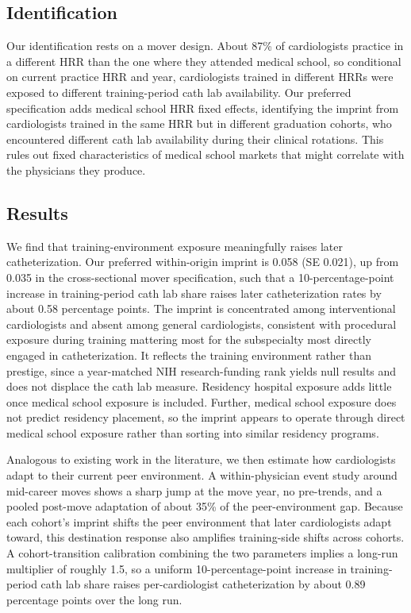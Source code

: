 \documentclass[11pt]{article}
\begin{document}
\subsection*{Identification}

Our identification rests on a mover design. About 87\% of cardiologists practice in a different HRR than the one where they attended medical school, so conditional on current practice HRR and year, cardiologists trained in different HRRs were exposed to different training-period cath lab availability. Our preferred specification adds medical school HRR fixed effects, identifying the imprint from cardiologists trained in the same HRR but in different graduation cohorts, who encountered different cath lab availability during their clinical rotations. This rules out fixed characteristics of medical school markets that might correlate with the physicians they produce.

\subsection*{Results}

We find that training-environment exposure meaningfully raises later catheterization. Our preferred within-origin imprint is 0.058 (SE 0.021), up from 0.035 in the cross-sectional mover specification, such that a 10-percentage-point increase in training-period cath lab share raises later catheterization rates by about 0.58 percentage points. The imprint is concentrated among interventional cardiologists and absent among general cardiologists, consistent with procedural exposure during training mattering most for the subspecialty most directly engaged in catheterization. It reflects the training environment rather than prestige, since a year-matched NIH research-funding rank yields null results and does not displace the cath lab measure. Residency hospital exposure adds little once medical school exposure is included. Further, medical school exposure does not predict residency placement, so the imprint appears to operate through direct medical school exposure rather than sorting into similar residency programs.

Analogous to existing work in the literature, we then estimate how cardiologists adapt to their current peer environment. A within-physician event study around mid-career moves shows a sharp jump at the move year, no pre-trends, and a pooled post-move adaptation of about 35\% of the peer-environment gap. Because each cohort's imprint shifts the peer environment that later cardiologists adapt toward, this destination response also amplifies training-side shifts across cohorts. A cohort-transition calibration combining the two parameters implies a long-run multiplier of roughly 1.5, so a uniform 10-percentage-point increase in training-period cath lab share raises per-cardiologist catheterization by about 0.89 percentage points over the long run.
\end{document}
